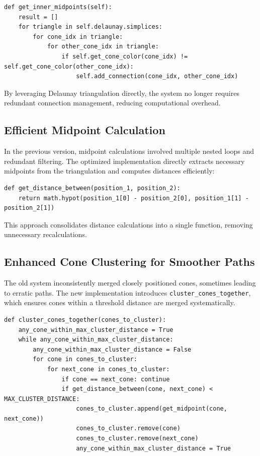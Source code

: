 \documentclass[a4paper,11pt]{report}
\begin{document}
\begin{verbatim}
def get_inner_midpoints(self):
    result = []
    for triangle in self.delaunay.simplices:
        for cone_idx in triangle:
            for other_cone_idx in triangle:
                if self.get_cone_color(cone_idx) != self.get_cone_color(other_cone_idx):
                    self.add_connection(cone_idx, other_cone_idx)
\end{verbatim}

By leveraging Delaunay triangulation directly, the system no longer requires redundant connection management, reducing computational overhead.

\subsection{Efficient Midpoint Calculation}
In the previous version, midpoint calculations involved multiple nested loops and redundant filtering. The optimized implementation directly extracts necessary midpoints from the triangulation and computes distances efficiently:

\begin{verbatim}
def get_distance_between(position_1, position_2):
    return math.hypot(position_1[0] - position_2[0], position_1[1] - position_2[1])
\end{verbatim}

This approach consolidates distance calculations into a single function, removing unnecessary recalculations.

\subsection{Enhanced Cone Clustering for Smoother Paths}
The old system inconsistently merged closely positioned cones, sometimes leading to erratic paths. The new implementation introduces \texttt{cluster\_cones\_together}, which ensures cones within a threshold distance are merged systematically.

\begin{verbatim}
def cluster_cones_together(cones_to_cluster):
    any_cone_within_max_cluster_distance = True
    while any_cone_within_max_cluster_distance:
        any_cone_within_max_cluster_distance = False
        for cone in cones_to_cluster:
            for next_cone in cones_to_cluster:
                if cone == next_cone: continue
                if get_distance_between(cone, next_cone) < MAX_CLUSTER_DISTANCE:
                    cones_to_cluster.append(get_midpoint(cone, next_cone))
                    cones_to_cluster.remove(cone)
                    cones_to_cluster.remove(next_cone)
                    any_cone_within_max_cluster_distance = True
\end{verbatim}
\end{document}
